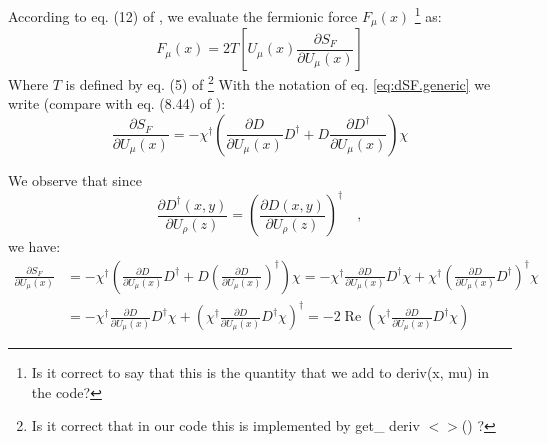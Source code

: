 \documentclass[12pt, a4paper]{article}
\begin{document}
According to eq. (12) of \cite{BITAR1989377}, we evaluate the fermionic force $F_{\mu}(x)$ 
\footnote{
Is it correct to say that this is the quantity that we add to deriv(x, mu) in the code?
}
as:
%
\begin{equation}
F_{\mu}(x) = 
2 T
\left[ 
U_{\mu}(x) \frac{\partial S_F}{\partial U_{\mu}(x)} 
\right]
\end{equation}
%
Where $T$ is defined by eq. (5) of \cite{BITAR1989377}
\footnote{Is it correct that in our code this is implemented by get\_ deriv $<>$() ?}
%
With the notation of eq. \eqref{eq:dSF.generic} we write 
(compare with eq. (8.44) of \cite{gattringer2009quantum}):
%
\begin{equation}
\frac{\partial S_F}{\partial U_{\mu}(x)}
= 
- \chi^{\dagger}
\left( 
\frac{\partial D}{\partial U_{\mu}(x)} D^{\dagger}
+
D \frac{\partial D^{\dagger}}{\partial U_{\mu}(x)}
\right) 
\chi
\end{equation}

We observe that since
%
\begin{equation}
\frac{\partial D^{\dagger}(x,y)}{\partial U_{\rho}(z)} =
\left(
\frac{\partial D(x,y)}{\partial U_{\rho}(z)}
\right)^{\dagger}
\quad ,
\end{equation}
%
we have:
%
\begin{equation}
\begin{aligned}
\frac{\partial S_F}{\partial U_{\mu}(x)}
&= 
- \chi^{\dagger}
\left( 
\frac{\partial D}{\partial U_{\mu}(x)} D^{\dagger}
+
D \left(\frac{\partial D}{\partial U_{\mu}(x)} \right)^{\dagger} 
\right) 
\chi
=
- \chi^{\dagger}
\frac{\partial D}{\partial U_{\mu}(x)} D^{\dagger}
\chi
+
\chi^{\dagger}
\left(\frac{\partial D}{\partial U_{\mu}(x)} D^{\dagger}
 \right)^{\dagger}
\chi
\\
&= 
- \chi^{\dagger}
\frac{\partial D}{\partial U_{\mu}(x)} D^{\dagger}
\chi
+
\left(
\chi^{\dagger}
\frac{\partial D}{\partial U_{\mu}(x)} D^{\dagger}
\chi
\right)^\dagger
= 
- 2 \operatorname{Re} 
\left(
\chi^{\dagger}
\frac{\partial D}{\partial U_{\mu}(x)} D^{\dagger}
\chi
\right)
\end{aligned}
\end{equation}
%







\printbibliography
\end{document}
